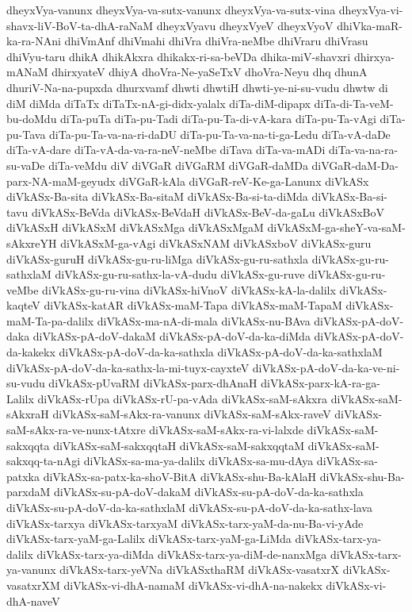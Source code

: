 {dheyxVya-vanunx
dheyxVya-va-sutx-vanunx
dheyxVya-va-sutx-vina
dheyxVya-vi-shavx-liV-BoV-ta-dhA-raNaM
dheyxVyavu
dheyxVyeV
dheyxVyoV
dhiVka-maR-ka-ra-NAni
dhiVmAnf
dhiVmahi
dhiVra
dhiVra-neMbe
dhiVraru
dhiVrasu
dhiVyu-taru
dhikA
dhikAkxra
dhikakx-ri-sa-beVDa
dhika-miV-shavxri
dhirxya-mANaM
dhirxyateV
dhiyA
dhoVra-Ne-yaSeTxV
dhoVra-Neyu
dhq
dhunA
dhuriV-Na-na-pupxda
dhurxvamf
dhwti
dhwtiH
dhwti-ye-ni-su-vudu
dhwtw
di
diM
diMda
diTaTx
diTaTx-nA-gi-didx-yalalx
diTa-diM-dipapx
diTa-di-Ta-veM-bu-doMdu
diTa-puTa
diTa-pu-Tadi
diTa-pu-Ta-di-vA-kara
diTa-pu-Ta-vAgi
diTa-pu-Tava
diTa-pu-Ta-va-na-ri-daDU
diTa-pu-Ta-va-na-ti-ga-Ledu
diTa-vA-daDe
diTa-vA-dare
diTa-vA-da-va-ra-neV-neMbe
diTava
diTa-va-mADi
diTa-va-na-ra-su-vaDe
diTa-veMdu
diV
diVGaR
diVGaRM
diVGaR-daMDa
diVGaR-daM-Da-parx-NA-maM-geyudx
diVGaR-kAla
diVGaR-reV-Ke-ga-Lanunx
diVkASx
diVkASx-Ba-sita
diVkASx-Ba-sitaM
diVkASx-Ba-si-ta-diMda
diVkASx-Ba-si-tavu
diVkASx-BeVda
diVkASx-BeVdaH
diVkASx-BeV-da-gaLu
diVkASxBoV
diVkASxH
diVkASxM
diVkASxMga
diVkASxMgaM
diVkASxM-ga-sheY-va-saM-sAkxreYH
diVkASxM-ga-vAgi
diVkASxNAM
diVkASxboV
diVkASx-guru
diVkASx-guruH
diVkASx-gu-ru-liMga
diVkASx-gu-ru-sathxla
diVkASx-gu-ru-sathxlaM
diVkASx-gu-ru-sathx-la-vA-dudu
diVkASx-gu-ruve
diVkASx-gu-ru-veMbe
diVkASx-gu-ru-vina
diVkASx-hiVnoV
diVkASx-kA-la-dalilx
diVkASx-kaqteV
diVkASx-katAR
diVkASx-maM-Tapa
diVkASx-maM-TapaM
diVkASx-maM-Ta-pa-dalilx
diVkASx-ma-nA-di-mala
diVkASx-nu-BAva
diVkASx-pA-doV-daka
diVkASx-pA-doV-dakaM
diVkASx-pA-doV-da-ka-diMda
diVkASx-pA-doV-da-kakekx
diVkASx-pA-doV-da-ka-sathxla
diVkASx-pA-doV-da-ka-sathxlaM
diVkASx-pA-doV-da-ka-sathx-la-mi-tuyx-cayxteV
diVkASx-pA-doV-da-ka-ve-ni-su-vudu
diVkASx-pUvaRM
diVkASx-parx-dhAnaH
diVkASx-parx-kA-ra-ga-Lalilx
diVkASx-rUpa
diVkASx-rU-pa-vAda
diVkASx-saM-sAkxra
diVkASx-saM-sAkxraH
diVkASx-saM-sAkx-ra-vanunx
diVkASx-saM-sAkx-raveV
diVkASx-saM-sAkx-ra-ve-nunx-tAtxre
diVkASx-saM-sAkx-ra-vi-lalxde
diVkASx-saM-sakxqqta
diVkASx-saM-sakxqqtaH
diVkASx-saM-sakxqqtaM
diVkASx-saM-sakxqq-ta-nAgi
diVkASx-sa-ma-ya-dalilx
diVkASx-sa-mu-dAya
diVkASx-sa-patxka
diVkASx-sa-patx-ka-shoV-BitA
diVkASx-shu-Ba-kAlaH
diVkASx-shu-Ba-parxdaM
diVkASx-su-pA-doV-dakaM
diVkASx-su-pA-doV-da-ka-sathxla
diVkASx-su-pA-doV-da-ka-sathxlaM
diVkASx-su-pA-doV-da-ka-sathx-lava
diVkASx-tarxya
diVkASx-tarxyaM
diVkASx-tarx-yaM-da-nu-Ba-vi-yAde
diVkASx-tarx-yaM-ga-Lalilx
diVkASx-tarx-yaM-ga-LiMda
diVkASx-tarx-ya-dalilx
diVkASx-tarx-ya-diMda
diVkASx-tarx-ya-diM-de-nanxMga
diVkASx-tarx-ya-vanunx
diVkASx-tarx-yeVNa
diVkASxthaRM
diVkASx-vasatxrX
diVkASx-vasatxrXM
diVkASx-vi-dhA-namaM
diVkASx-vi-dhA-na-nakekx
diVkASx-vi-dhA-naveV
}
